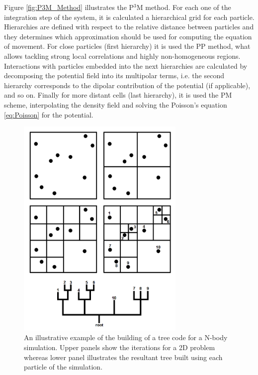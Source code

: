 Figure \ref{fig:P3M_Method} illustrates the P$^3$M method. For each one of
the integration step of the system, it is calculated a hierarchical grid 
for each particle. Hierarchies are defined with respect to the relative
distance between particles and they determines which approximation should
be used for computing the equation of movement. For close particles (first
hierarchy) it is used the PP method, what allows tackling strong local 
correlations and highly non-homogeneous regions. Interactions with 
particles embedded into the next hierarchies are calculated by decomposing 
the potential field into its multipolar terms, i.e. the second hierarchy
corresponds to the dipolar contribution of the potential (if applicable), 
and so on. Finally for more distant cells (last hierarchy), it is used the
PM scheme, interpolating the density field and solving the Poisson's 
equation \ref{eq:Poisson} for the potential.


\begin{figure}[htbp]
	\centering
	\includegraphics[width=0.72\textwidth]
	{./figures/3_nbody_simulations/TreeCode.png}

	\caption{\small{An illustrative example of the building of a tree code
	for a N-body simulation. Upper panels show the iterations for a 2D 
	problem whereas lower panel illustrates the resultant tree built using 
	each particle of the simulation.}}
	
	\label{fig:Tree_Code}
\end{figure}
\newpage


